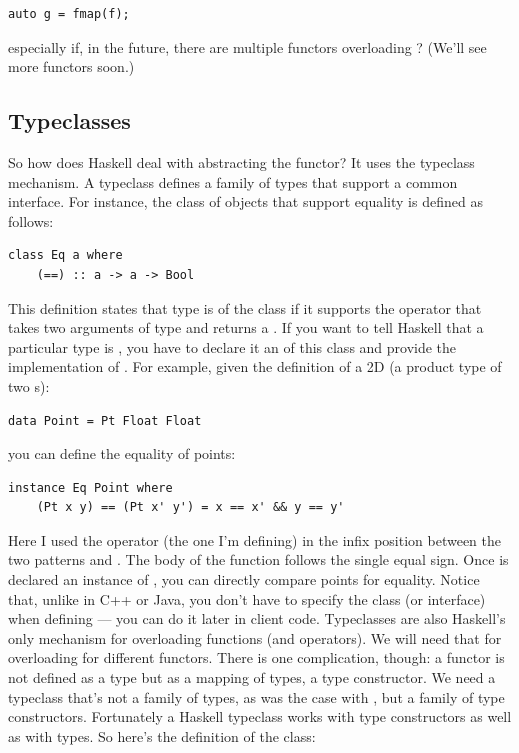 \begin{Verbatim}[commandchars=\\\{\}]
auto g = fmap(f);
\end{Verbatim}
especially if, in the future, there are multiple functors overloading
? (We'll see more functors soon.)

\subsection{Typeclasses}\label{typeclasses}

So how does Haskell deal with abstracting the functor? It uses the
typeclass mechanism. A typeclass defines a family of types that support
a common interface. For instance, the class of objects that support
equality is defined as follows:

\begin{Verbatim}[commandchars=\\\{\}]
class Eq a where
    (==) :: a -> a -> Bool
\end{Verbatim}
This definition states that type  is of the class 
if it supports the operator \code{(==)} that takes two arguments of
type  and returns a . If you want to tell Haskell
that a particular type is , you have to declare it an
 of this class and provide the implementation of
\code{(==)}. For example, given the definition of a 2D 
(a product type of two s):

\begin{Verbatim}[commandchars=\\\{\}]
data Point = Pt Float Float
\end{Verbatim}
you can define the equality of points:

\begin{Verbatim}[commandchars=\\\{\}]
instance Eq Point where
    (Pt x y) == (Pt x' y') = x == x' && y == y'
\end{Verbatim}
Here I used the operator \code{(==)} (the one I'm defining) in the
infix position between the two patterns  and
. The body of the function follows the
single equal sign. Once  is declared an instance of
, you can directly compare points for equality. Notice that,
unlike in C++ or Java, you don't have to specify the  class
(or interface) when defining  --- you can do it later in
client code. Typeclasses are also Haskell's only mechanism for
overloading functions (and operators). We will need that for overloading
 for different functors. There is one complication, though:
a functor is not defined as a type but as a mapping of types, a type
constructor. We need a typeclass that's not a family of types, as was
the case with , but a family of type constructors.
Fortunately a Haskell typeclass works with type constructors as well as
with types. So here's the definition of the  class:

